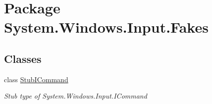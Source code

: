 \hypertarget{namespace_system_1_1_windows_1_1_input_1_1_fakes}{\section{Package System.\-Windows.\-Input.\-Fakes}
\label{namespace_system_1_1_windows_1_1_input_1_1_fakes}
}
\subsection*{Classes}
\begin{DoxyCompactItemize}
\item 
class \hyperlink{class_system_1_1_windows_1_1_input_1_1_fakes_1_1_stub_i_command}{Stub\-I\-Command}
\begin{DoxyCompactList}\small\item\em Stub type of System.\-Windows.\-Input.\-I\-Command\end{DoxyCompactList}\end{DoxyCompactItemize}

